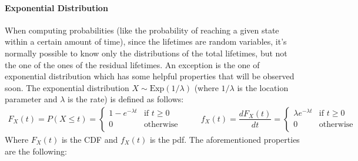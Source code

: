 \documentclass[12pt,a4paper]{article}
\begin{document}
\paragraph{Exponential Distribution}
When computing probabilities (like the probability of reaching a given state within a certain amount of time), since the lifetimes are random variables, it’s normally possible to know only the distributions of the total lifetimes, but not the one of the ones of the residual lifetimes. An exception is the one of exponential distribution which has some helpful properties that will be observed soon. The exponential distribution $X \sim \text{Exp}(1/\lambda)$ (where $1/\lambda$ is the location parameter and $\lambda$ is the rate) is defined as follows:
$$
\begin{matrix}
F_X(t)=P\left(X\leq t\right)=
\begin{cases}
1-e^{-\lambda t} & \textrm{if } t\geq 0 \\
0 & \textrm{otherwise} \\
\end{cases}
&&&
f_X(t)=\dfrac{dF_X(t)}{dt}=
\begin{cases}
\lambda e^{-\lambda t} & \textrm{if } t\geq 0 \\
0 & \textrm{otherwise} \\
\end{cases}
\end{matrix}
$$
Where $F_X(t)$ is the CDF and $f_X(t)$ is the pdf. The aforementioned properties are the following:
\end{document}
